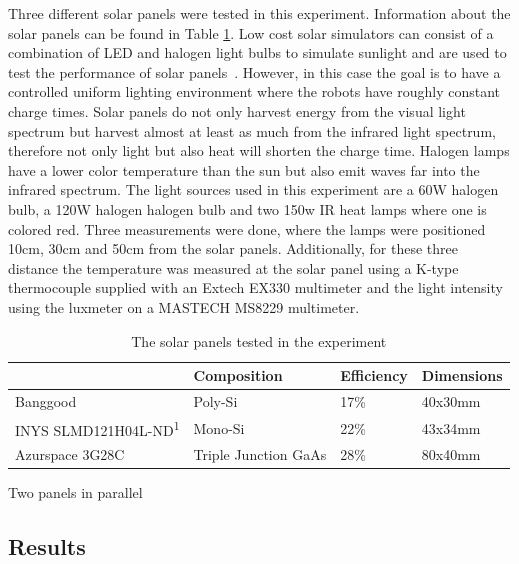 Three different solar panels were tested in this experiment. Information about the solar panels can be found in Table \ref{tab:solar_panels}.
Low cost solar simulators can consist of a combination of LED and halogen light bulbs to simulate sunlight and are used to test the performance of solar panels~\cite{grandi_tia_2014}.
However, in this case the goal is to have a controlled uniform lighting environment where the robots have roughly constant charge times.
Solar panels do not only harvest energy from the visual light spectrum but harvest almost at least as much from the infrared light spectrum, therefore not only light but also heat will shorten the charge time.
Halogen lamps have a lower color temperature than the sun but also emit waves far into the infrared spectrum.
The light sources used in this experiment are a 60W halogen bulb, a 120W halogen halogen bulb and two 150w IR heat lamps where one is colored red.
Three measurements were done, where the lamps were positioned 10cm, 30cm and 50cm from the solar panels.
Additionally, for these three distance the temperature was measured at the solar panel using a K-type thermocouple supplied with an Extech EX330 multimeter and the light intensity using the luxmeter on a MASTECH MS8229 multimeter.

\begin{table}[t]
	\centering
	\begin{threeparttable}
		\caption{The solar panels tested in the experiment}
		\label{tab:solar_panels}
		\small
		\begin{tabular}{|l|l|l|l|}
			\hline
			& Composition & Efficiency & Dimensions \\
			\hline \hline
			Banggood \cite{bangood_solar_2017}& Poly-Si & 17\% & 40x30mm \\
			\hline
			INYS SLMD121H04L-ND\textsuperscript{1}& Mono-Si & 22\% & 43x34mm \\
			\hline
			Azurspace 3G28C & Triple Junction GaAs& 28\% & 80x40mm \\
			\hline
		\end{tabular}
	\begin{tablenotes}
		\small
		\item [1] Two panels in parallel
	\end{tablenotes}
	\end{threeparttable}
\end{table}

\subsection{Results}

